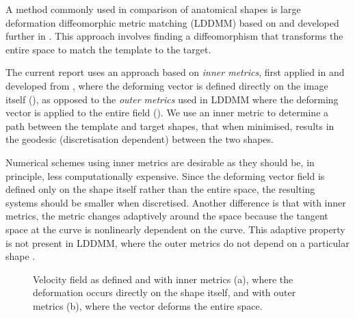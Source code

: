 \documentclass[a4paper, 12pt]{article}
\begin{document}
A method commonly used in comparison of anatomical shapes is large deformation
diffeomorphic metric matching (LDDMM) based on \cite{grenander1993general}
and developed further in
\cite{beg2005computing,bruveris2011momentum,glaunes2008large}. This approach
involves finding a diffeomorphism that transforms the entire space to match the
template to the target. 

The current report uses an approach based on \emph{inner metrics}, first applied
in \cite{bauer2011new} and developed from
\cite{michor2005vanishing,michor2003riemannian,younes2008metric}, where the
deforming vector is defined directly on the image itself (),
as opposed to the \emph{outer metrics} used in LDDMM where the deforming vector
is applied to the entire field (). We use an inner metric to
determine a path between the template and target shapes, that when minimised,
results in the geodesic (discretisation dependent) between the two shapes.

Numerical schemes using inner metrics are desirable as they
should be, in principle, less computationally expensive. Since the deforming
vector field is defined only on the shape itself rather than the entire space,
the resulting systems should be smaller when discretised. Another difference is
that with inner metrics, the metric changes adaptively around the space because
the tangent space at the curve is nonlinearly dependent on the curve. This
adaptive property is not present in LDDMM, where the outer metrics do not depend
on a particular shape \cite{bauer2011new}. 



\begin{figure}[h!]
  \centering
  \caption[Inner versus outer metrics]{Velocity field as defined and with inner metrics (a), where the
    deformation occurs directly on the shape itself, and with outer metrics
    (b), where the vector deforms the entire space.}
  \label{fig:metrics}
\end{figure}
\end{document}
